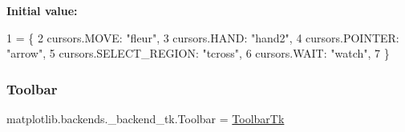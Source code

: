 {\bfseries Initial value\+:}
\begin{DoxyCode}
1 =  \{
2     cursors.MOVE: \textcolor{stringliteral}{"fleur"},
3     cursors.HAND: \textcolor{stringliteral}{"hand2"},
4     cursors.POINTER: \textcolor{stringliteral}{"arrow"},
5     cursors.SELECT\_REGION: \textcolor{stringliteral}{"tcross"},
6     cursors.WAIT: \textcolor{stringliteral}{"watch"},
7     \}
\end{DoxyCode}
\mbox{\label{namespacematplotlib_1_1backends_1_1__backend__tk_acfe241fed63edba68189f3c46b3fdff2}} 
\subsubsection{\texorpdfstring{Toolbar}{Toolbar}}
{\footnotesize\ttfamily matplotlib.\+backends.\+\_\+backend\+\_\+tk.\+Toolbar = \hyperlink{classmatplotlib_1_1backends_1_1__backend__tk_1_1ToolbarTk}{Toolbar\+Tk}}

